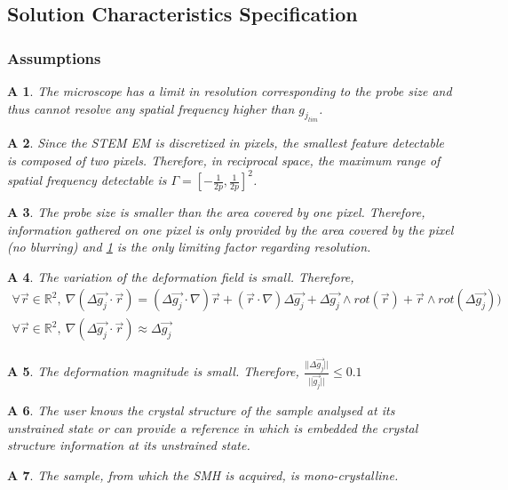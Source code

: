 \documentclass[12pt]{article}
\newtheorem{A}{A}
\begin{document}
\subsection{Solution Characteristics Specification}

\subsubsection{Assumptions}

\begin{A}
\normalfont The microscope has a limit in resolution corresponding to the probe size and thus cannot resolve any spatial frequency higher than $g_{j_{lim}}$. 
\label{A_1}
\end{A}
\begin{A}
\normalfont Since the STEM EM is discretized in pixels, the smallest feature detectable is composed of two pixels. Therefore, in reciprocal space, the maximum range of spatial frequency detectable is $\Gamma=[-\frac{1}{2p},\frac{1}{2p}]^{2}$.
\label{A_2}
\end{A}
\begin{A}
\normalfont The probe size is smaller than the area covered by one pixel. Therefore, information gathered on one pixel is only provided by the area covered by the pixel (no blurring) and \cref{A_1} is the only limiting factor regarding resolution.
\label{A_3}
\end{A}
\begin{A}
\label{A_4}
\normalfont The variation of the deformation field is small. Therefore,
\begin{equation*}
\begin{gathered}
\forall \vec{r} \in \mathbb{R}^2, \ \nabla (\Delta\overrightarrow{g_j}\cdot\vec{r})= (\Delta\overrightarrow{g_j}\cdot\nabla)\vec{r}+(\vec{r}\cdot\nabla)\Delta\overrightarrow{g_j}+\Delta\overrightarrow{g_j}\wedge rot(\vec{r})+\vec{r}\wedge rot(\Delta\overrightarrow{g_j}))\\
\forall \vec{r} \in \mathbb{R}^2, \ \nabla (\Delta\overrightarrow{g_j}\cdot\vec{r})\approx \Delta\overrightarrow{g_j}
\end{gathered}
\end{equation*}
\end{A}
\begin{A}
\label{A_5}
\normalfont The deformation magnitude is small. Therefore, $\frac{||\Delta\overrightarrow{g_j} ||}{||\overrightarrow{g_j} ||}\leq 0.1$
\end{A}
\begin{A}
\label{A_6}
\normalfont The user knows the crystal structure of the sample analysed at its unstrained state or can provide a reference in which is embedded the crystal structure information at its unstrained state.
\end{A}
\begin{A}
\label{A_7}
\normalfont The sample, from which the SMH is acquired, is mono-crystalline.
\end{A}
\end{document}
